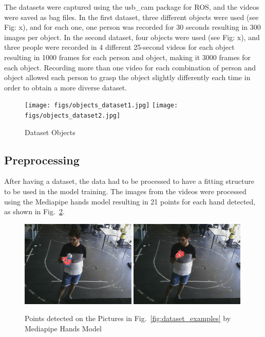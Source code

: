 The datasets were captured using the usb\_cam package for ROS, and the videos were saved as bag files. In the first dataset, three different objects were used (see Fig: x), and for each one, one person was recorded for 30 seconds resulting in 300 images per object. In the second dataset, four objects were used (see Fig: x), and three people were recorded in 4 different 25-second videos for each object resulting in 1000 frames for each person and object, making it 3000 frames for each object. Recording more than one video for each combination of person and object allowed each person to grasp the object slightly differently each time in order to obtain a more diverse dataset.

\begin{figure}[H]
    \centerline{\texttt{[image: figs/objects\_dataset1.jpg]} \texttt{[image: figs/objects\_dataset2.jpg]}}
    \caption[Dataset Objects]{Dataset Objects}
    \label{fig:dataset_objects}
\end{figure}

\subsection{Preprocessing}

After having a dataset, the data had to be processed to have a fitting structure to be used in the model training. The images from the videos were processed using the Mediapipe hands model resulting in 21 points for each hand detected, as shown in Fig.~\ref{fig:dataset_examples2}.

\begin{figure}[H]
    \centerline{\includegraphics[width=0.49\textwidth]{figs/dataset_preprocessing2_1.png} \includegraphics[width=0.49\textwidth]{figs/dataset_preprocessing2_2.png}}
    \caption[Points detected on the Pictures in Fig.~\ref{fig:dataset_examples} by Mediapipe Hands Model]{Points detected on the Pictures in Fig.~\ref{fig:dataset_examples} by Mediapipe Hands Model}
    \label{fig:dataset_examples2}
\end{figure}

